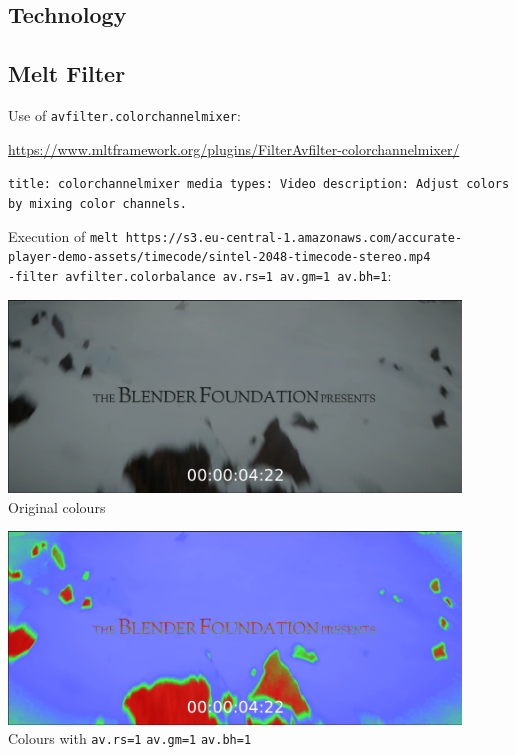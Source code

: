 \documentclass[12pt,a4paper]{article}
\begin{document}
\subsection{Technology} \label{subsection:technology}







\subsection{Melt Filter} \label{subsection:meltfilter}


Use of \texttt{avfilter.colorchannelmixer}:

\url{https://www.mltframework.org/plugins/FilterAvfilter-colorchannelmixer/}

\texttt{title: colorchannelmixer \newline
	media types: Video \newline
	description: Adjust colors by mixing color channels.}

Execution of \texttt{melt https://s3.eu-central-1.amazonaws.com/accurate-player\--demo-assets/timecode/sintel-2048-timecode-stereo.mp4 \\ -filter avfilter.colorbalance av.rs=1 av.gm=1 av.bh=1}:


\begin{minipage}{0.5\textwidth}
	\includegraphics[width=0.9\textwidth]{colourdefault.png}
	Original colours
\end{minipage}\begin{minipage}{0.5\textwidth}
	\includegraphics[width=0.9\textwidth]{colourhigh.png}
	Colours with \texttt{av.rs=1} \texttt{av.gm=1} \texttt{av.bh=1}
\end{minipage}
\end{document}
